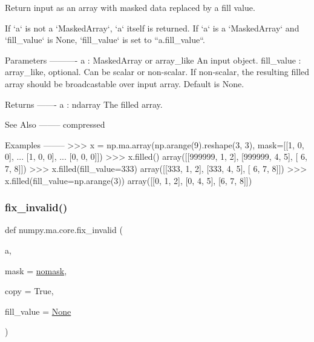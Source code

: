 \begin{DoxyVerb}Return input as an array with masked data replaced by a fill value.

If `a` is not a `MaskedArray`, `a` itself is returned.
If `a` is a `MaskedArray` and `fill_value` is None, `fill_value` is set to
``a.fill_value``.

Parameters
----------
a : MaskedArray or array_like
    An input object.
fill_value : array_like, optional.
    Can be scalar or non-scalar. If non-scalar, the
    resulting filled array should be broadcastable
    over input array. Default is None.

Returns
-------
a : ndarray
    The filled array.

See Also
--------
compressed

Examples
--------
>>> x = np.ma.array(np.arange(9).reshape(3, 3), mask=[[1, 0, 0],
...                                                   [1, 0, 0],
...                                                   [0, 0, 0]])
>>> x.filled()
array([[999999,      1,      2],
       [999999,      4,      5],
       [     6,      7,      8]])
>>> x.filled(fill_value=333)
array([[333,   1,   2],
       [333,   4,   5],
       [  6,   7,   8]])
>>> x.filled(fill_value=np.arange(3))
array([[0, 1, 2],
       [0, 4, 5],
       [6, 7, 8]])\end{DoxyVerb}
 \mbox{\label{namespacenumpy_1_1ma_1_1core_adf010ab7d0a3763c340cd471092ca008}} 
\subsubsection{\texorpdfstring{fix\+\_\+invalid()}{fix\_invalid()}}
{\footnotesize\ttfamily def numpy.\+ma.\+core.\+fix\+\_\+invalid (\begin{DoxyParamCaption}\item[{}]{a,  }\item[{}]{mask = {\ttfamily \hyperlink{namespacenumpy_1_1ma_1_1core_abafbbb38c7afc60936cc5a55fa23ecfa}{nomask}},  }\item[{}]{copy = {\ttfamily True},  }\item[{}]{fill\+\_\+value = {\ttfamily \hyperlink{namespacenumpy_1_1ma_1_1core_a647ee1848dfa3692fe35a663a2aa40b3}{None}} }\end{DoxyParamCaption})}

